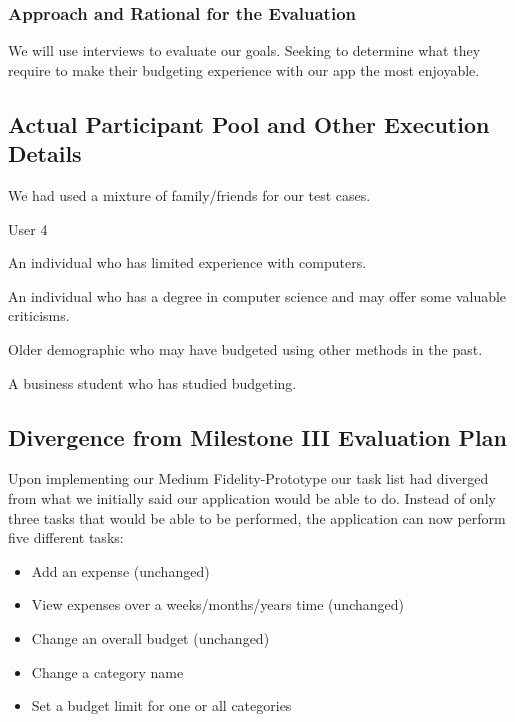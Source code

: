 \documentclass{chi2011}
\begin{document}
		\subsubsection{Approach and Rational for the Evaluation}

		We will use interviews to evaluate our goals. Seeking to determine what they require to make their
		budgeting experience with our app the most enjoyable.


	\subsection{Actual Participant Pool and Other Execution Details}

	We had used a mixture of family/friends for our test cases. 

	\begin{labeling}{User 4}
		\item [User 1] An individual who has limited experience with computers.  
		\item [User 2] An individual who has a degree in computer science and may offer some valuable 
		criticisms. 
		\item [User 3] Older demographic who may have budgeted using other methods in the past.
		\item [User 4] A business student who has studied budgeting.
	\end{labeling}


	\subsection{Divergence from Milestone III Evaluation Plan}

	Upon implementing our Medium Fidelity-Prototype our task list had diverged from what we initially
	said our application would be able to do. Instead of only three tasks that would be able to be 
	performed, the application can now perform five different tasks:
	
	\begin{itemize}[noitemsep]
		\item Add an expense (unchanged)
		\item View expenses over a weeks/months/years time (unchanged)
		\item Change an overall budget (unchanged)
		\item Change a category name
		\item Set a budget limit for one or all categories
	\end{itemize}
\end{document}
